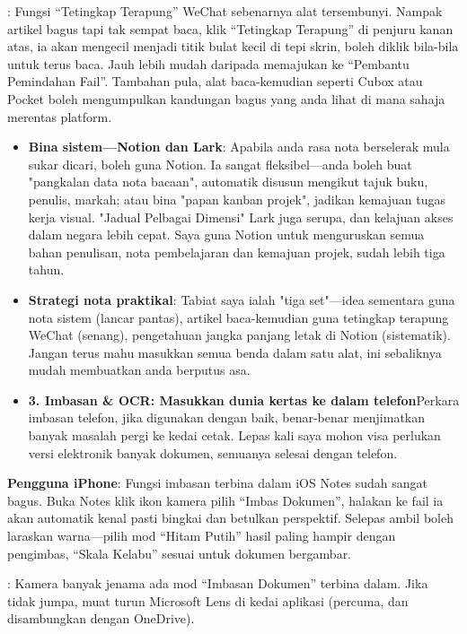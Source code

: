
: Fungsi “Tetingkap Terapung” WeChat sebenarnya alat tersembunyi. Nampak artikel bagus tapi tak sempat baca, klik “Tetingkap Terapung” di penjuru kanan atas, ia akan mengecil menjadi titik bulat kecil di tepi skrin, boleh diklik bila-bila untuk terus baca. Jauh lebih mudah daripada memajukan ke “Pembantu Pemindahan Fail”. Tambahan pula, alat baca-kemudian seperti Cubox atau Pocket boleh mengumpulkan kandungan bagus yang anda lihat di mana sahaja merentas platform.

\begin{itemize}
  \item \textbf{Bina sistem—Notion dan Lark}: Apabila anda rasa nota berselerak mula sukar dicari, boleh guna Notion. Ia sangat fleksibel—anda boleh buat "pangkalan data nota bacaan", automatik disusun mengikut tajuk buku, penulis, markah; atau bina "papan kanban projek", jadikan kemajuan tugas kerja visual. "Jadual Pelbagai Dimensi" Lark juga serupa, dan kelajuan akses dalam negara lebih cepat. Saya guna Notion untuk menguruskan semua bahan penulisan, nota pembelajaran dan kemajuan projek, sudah lebih tiga tahun.
  \item \textbf{Strategi nota praktikal}: Tabiat saya ialah "tiga set"—idea sementara guna nota sistem (lancar pantas), artikel baca-kemudian guna tetingkap terapung WeChat (senang), pengetahuan jangka panjang letak di Notion (sistematik). Jangan terus mahu masukkan semua benda dalam satu alat, ini sebaliknya mudah membuatkan anda berputus asa.
  \item \textbf{3. Imbasan \& OCR: Masukkan dunia kertas ke dalam telefon}Perkara imbasan telefon, jika digunakan dengan baik, benar-benar menjimatkan banyak masalah pergi ke kedai cetak. Lepas kali saya mohon visa perlukan versi elektronik banyak dokumen, semuanya selesai dengan telefon.
\end{itemize}

\textbf{Pengguna iPhone}: Fungsi imbasan terbina dalam iOS Notes sudah sangat bagus. Buka Notes klik ikon kamera pilih “Imbas Dokumen”, halakan ke fail ia akan automatik kenal pasti bingkai dan betulkan perspektif. Selepas ambil boleh laraskan warna—pilih mod “Hitam Putih” hasil paling hampir dengan pengimbas, “Skala Kelabu” sesuai untuk dokumen bergambar.


: Kamera banyak jenama ada mod “Imbasan Dokumen” terbina dalam. Jika tidak jumpa, muat turun Microsoft Lens di kedai aplikasi (percuma, dan disambungkan dengan OneDrive).

